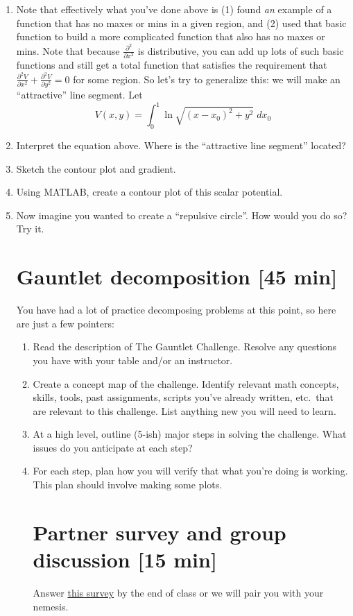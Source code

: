 \documentclass{tufte-handout}
\begin{document}
\begin{enumerate}[series=exercises, label=\textbf{Exercise} (\arabic*)]
\begin{enumerate}[resume=exercises, label=\textbf{Exercise} (\arabic*)]
\begin{enumerate}[resume=exercises, label=\textbf{Exercise} (\arabic*)]
\begin{enumerate}[resume=exercises, label=\textbf{Exercise} (\arabic*)]
\ee
\item Note that effectively what you've done above is (1) found {\it an} example of a function that has no maxes or mins in a given region, and (2) used that basic function to build a more complicated function that also has no maxes or mins. Note that because $\frac{\partial^2}{\partial x^2}$ is distributive, you can add up lots of such basic functions and still get a total function that satisfies the requirement that $ \frac{\partial^2 V}{\partial x^2} +  \frac{\partial^2 V}{\partial y^2}  = 0$ for some region. So let's try to generalize this: we will make an ``attractive'' line segment.  Let
$$V(x,y) = \int_0^1 \ln \sqrt{(x-x_0)^2 + y^2} \; dx_0$$
\be
\item Interpret the equation above.  Where is the ``attractive line segment'' located?
\item Sketch the contour plot and gradient.
\item Using MATLAB, create a contour plot of this scalar potential.
\item Now imagine you wanted to create a ``repulsive circle''.  How would you do so?  Try it.
\ee
\ee

\section{Gauntlet decomposition [45 min]}
You have had a lot of practice decomposing problems at this point, so here are just a few pointers:
\begin{enumerate}[resume=exercises, label=\textbf{Exercise} (\arabic*)]
\item Read the description of The Gauntlet Challenge. Resolve any questions you have with your table and/or an instructor.
\item Create a concept map of the challenge. Identify relevant math concepts, skills, tools, past assignments, scripts you've already written, etc.\ that are relevant to this challenge. List anything new you will need to learn.
\item At a high level, outline (5-ish) major steps in solving the challenge. What issues do you anticipate at each step? 
\item For each step, plan how you will verify that what you're doing is working. This plan should involve making some plots.
\ee

\section{Partner survey and group discussion [15 min]}
Answer \href{https://docs.google.com/forms/d/e/1FAIpQLSer8NScuVmUpTgT363HeB8-3Bl3-OJrOvEBCnkUzB9tuWLGeg/viewform?usp=sf_link}{this survey} by the end of class or we will pair you with your nemesis.



\end{enumerate}
\end{enumerate}
\end{enumerate}
\end{enumerate}
\end{enumerate}
\end{document}
